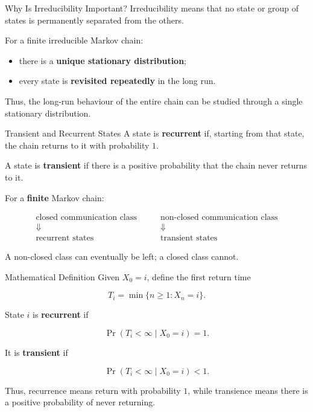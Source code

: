 \documentclass[
  ignorenonframetext,
  aspectratio=169,
]{beamer}
\providecommand{\tightlist}{%
  \setlength{\itemsep}{0pt}\setlength{\parskip}{0pt}}
\begin{document}
\begin{frame}{Why Is Irreducibility Important?}
\protect{}\label{why-is-irreducibility-important}
Irreducibility means that no state or group of states is permanently
separated from the others.

For a finite irreducible Markov chain:

\begin{itemize}
\tightlist
\item
  there is a \textbf{unique stationary distribution};
\item
  every state is \textbf{revisited repeatedly} in the long run.
\end{itemize}

Thus, the long-run behaviour of the entire chain can be studied through
a single stationary distribution.
\end{frame}

\begin{frame}{Transient and Recurrent States}
\protect{}\label{transient-and-recurrent-states}
A state is \textbf{recurrent} if, starting from that state, the chain
returns to it with probability \(1\).

A state is \textbf{transient} if there is a positive probability that
the chain never returns to it.

For a \textbf{finite} Markov chain:

\[
\boxed{
\begin{array}{c}
\text{closed communication class}\\
\Downarrow\\
\text{recurrent states}
\end{array}
}
\qquad
\boxed{
\begin{array}{c}
\text{non-closed communication class}\\
\Downarrow\\
\text{transient states}
\end{array}
}
\]

A non-closed class can eventually be left; a closed class cannot.
\end{frame}

\begin{frame}{Mathematical Definition}
\protect{}\label{mathematical-definition}
Given \(X_0=i\), define the first return time

\[
T_i=\min\{n\geq1:X_n=i\}.
\]

State \(i\) is \textbf{recurrent} if

\[
\Pr(T_i<\infty\mid X_0=i)=1.
\]

It is \textbf{transient} if

\[
\Pr(T_i<\infty\mid X_0=i)<1.
\]

Thus, recurrence means return with probability \(1\), while transience
means there is a positive probability of never returning.
\end{frame}
\end{document}
